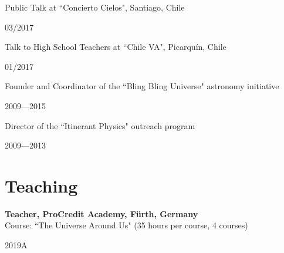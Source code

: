 \documentclass[12pt, a4paper]{article} %
\begin{document}
\begin{minipage}[t]{0.7\textwidth}
\begin{flushleft}%
  \setlength{\leftskip}{0.2cm}%
Public Talk at ``Concierto Cielos", Santiago, Chile
\end{flushleft}
\end{minipage}
\begin{minipage}[t]{0.3\textwidth}
\hfill 03/2017
\end{minipage}

\begin{minipage}[t]{0.7\textwidth}
\begin{flushleft}%
  \setlength{\leftskip}{0.2cm}%
Talk to High School Teachers at ``Chile VA", Picarqu\'in, Chile
\end{flushleft}
\end{minipage}
\begin{minipage}[t]{0.3\textwidth}
\hfill 01/2017
\end{minipage}


\begin{minipage}[t]{0.8\textwidth}
\begin{flushleft}%
  \setlength{\leftskip}{0.2cm}%
Founder and Coordinator of the ``Bling Bling Universe" astronomy initiative
\end{flushleft}
\end{minipage}
\begin{minipage}[t]{0.2\textwidth}
\hfill 2009---2015
\end{minipage}


\begin{minipage}[t]{0.7\textwidth}
\begin{flushleft}%
  \setlength{\leftskip}{0.2cm}%
Director of the ``Itinerant Physics" outreach program
\end{flushleft}
\end{minipage}
\begin{minipage}[t]{0.3\textwidth}
\hfill 2009---2013
\end{minipage}

\section*{Teaching}

\begin{minipage}[t]{0.7\textwidth}
\begin{flushleft}%
  \setlength{\leftskip}{0.2cm}%
\textbf{Teacher, ProCredit Academy, F\"urth, Germany}\\
Course: ``The Universe Around Us" (35 hours per course, 4 courses)
\end{flushleft}
\end{minipage}
\begin{minipage}[t]{0.3\textwidth}
\hfill 2019A
\end{minipage}\\
\end{document}
